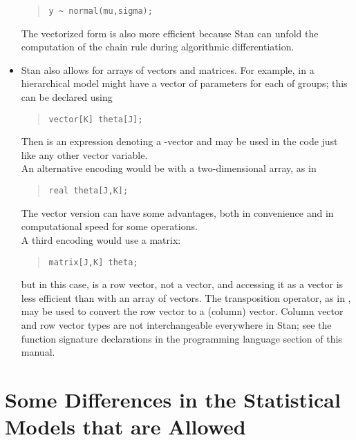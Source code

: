 \begin{itemize}
%
\begin{quote}
\begin{Verbatim}
y ~ normal(mu,sigma);
\end{Verbatim}
\end{quote}
%
The vectorized form is also more efficient because Stan can unfold the
computation of the chain rule during algorithmic differentiation.
%
\item Stan also allows for arrays of vectors and matrices.
  For example, in a hierarchical model might have a vector of 
  parameters for each of  groups; this can be declared using
\begin{quote}
\begin{Verbatim}
vector[K] theta[J];
\end{Verbatim}
\end{quote}
%
Then  is an expression denoting a -vector and
may be used in the code just like any other vector variable.
\\[6pt]
An alternative encoding would be with a two-dimensional array, as in
\begin{quote}
\begin{Verbatim}
real theta[J,K];
\end{Verbatim}
\end{quote}
%
The vector version can have some advantages, both in convenience and
in computational speed for some operations.
\\[6pt]
A third encoding would use a matrix:
%
\begin{quote}
\begin{Verbatim}
matrix[J,K] theta;
\end{Verbatim}
\end{quote}
%
but in this case,  is a row vector, not a vector, and
accessing it as a vector is less efficient than with an array of
vectors.  The transposition operator, as in , may be
used to convert the row vector  to a (column) vector.
Column vector and row vector types are not interchangeable everywhere
in Stan; see the function signature declarations in the programming
language section of this manual.
\end{itemize}

\section{Some Differences in the Statistical Models that are Allowed}

